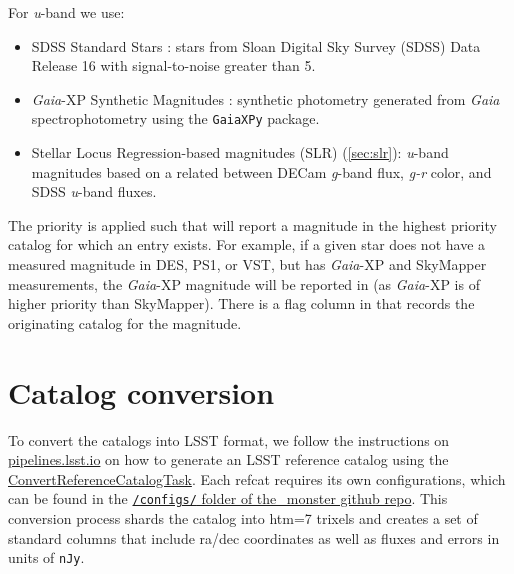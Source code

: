 For \textit{u}-band we use:
\begin{itemize}
    \item SDSS Standard Stars \citep[Section \ref{sec:sdss};][]{Ahumada:2020}: stars from Sloan Digital Sky Survey (SDSS) Data Release 16 with signal-to-noise greater than 5.
    \item \emph{Gaia}-XP Synthetic Magnitudes \citep[Section \ref{sec:gaiaxp}][]{GaiaCollaboration:2023-XP}: synthetic photometry generated from \emph{Gaia} spectrophotometry using the \texttt{GaiaXPy} package.
    \item Stellar Locus Regression-based magnitudes (SLR) (\ref{sec:slr}): \textit{u}-band magnitudes based on a related between DECam \textit{g}-band flux, \textit{g-r} color, and SDSS \textit{u}-band fluxes.
\end{itemize}

The priority is applied such that \monster will report a magnitude in the highest priority catalog for which an entry exists. For example, if a given star does not have a measured magnitude in DES, PS1, or VST, but has \emph{Gaia}-XP and SkyMapper measurements, the \emph{Gaia}-XP magnitude will be reported in \monster (as \emph{Gaia}-XP is of higher priority than SkyMapper). There is a flag column in \monster that records the originating catalog for the magnitude.

\section{Catalog conversion}
\label{sec:conversion}
To convert the catalogs into LSST format, we follow the instructions on \href{https://pipelines.lsst.io/modules/lsst.meas.algorithms/creating-a-reference-catalog.html}{pipelines.lsst.io} on how to generate an LSST reference catalog using the \href{https://pipelines.lsst.io/modules/lsst.meas.algorithms/tasks/lsst.meas.algorithms.ConvertReferenceCatalogTask.html#lsst-task-lsst-meas-algorithms-convertreferencecatalog-convertreferencecatalogtask}{ConvertReferenceCatalogTask}. Each refcat requires its own configurations, which can be found in the \href{https://github.com/lsst-dm/the_monster/tree/main/configs}{\texttt{/configs/} folder of the\_monster github repo}.
This conversion process shards the catalog into htm=7 trixels and creates a set of standard columns that include ra/dec coordinates as well as fluxes and errors in units of \texttt{nJy}.

